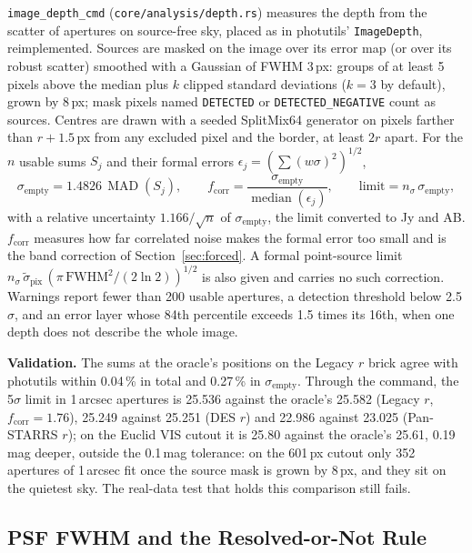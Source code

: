 \documentclass[11pt,a4paper]{article}
\newcommand{\code}[1]{\texttt{\small #1}}
\begin{document}
    \code{image\_depth\_cmd} (\code{core/analysis/depth.rs}) measures the depth from the scatter of apertures on source-free sky, placed as in photutils' \code{ImageDepth}, reimplemented. Sources are masked on the image over its error map (or over its robust scatter) smoothed with a Gaussian of FWHM 3\,px: groups of at least 5 pixels above the median plus $k$ clipped standard deviations ($k = 3$ by default), grown by 8\,px; mask pixels named \code{DETECTED} or \code{DETECTED\_NEGATIVE} count as sources. Centres are drawn with a seeded SplitMix64 generator on pixels farther than $r + 1.5$\,px from any excluded pixel and the border, at least $2r$ apart. For the $n$ usable sums $S_j$ and their formal errors $\epsilon_j = (\sum (w\sigma)^2)^{1/2}$,
    \begin{equation}
        \sigma_{\text{empty}} = 1.4826\,\operatorname{MAD}(S_j), \qquad
        f_{\text{corr}} = \frac{\sigma_{\text{empty}}}{\operatorname{median}(\epsilon_j)}, \qquad
        \text{limit} = n_\sigma\,\sigma_{\text{empty}},
    \end{equation}
    with a relative uncertainty $1.166/\sqrt{n}$ of $\sigma_{\text{empty}}$, the limit converted to Jy and AB. $f_{\text{corr}}$ measures how far correlated noise makes the formal error too small and is the band correction of Section~\ref{sec:forced}. A formal point-source limit $n_\sigma\,\tilde{\sigma}_{\text{pix}}\,(\pi\,\text{FWHM}^2/(2\ln 2))^{1/2}$ is also given and carries no such correction. Warnings report fewer than 200 usable apertures, a detection threshold below 2.5$\sigma$, and an error layer whose 84th percentile exceeds 1.5 times its 16th, when one depth does not describe the whole image.

    \textbf{Validation.} The sums at the oracle's positions on the Legacy $r$ brick agree with photutils within 0.04\,\% in total and 0.27\,\% in $\sigma_{\text{empty}}$. Through the command, the 5$\sigma$ limit in 1\,arcsec apertures is 25.536 against the oracle's 25.582 (Legacy $r$, $f_{\text{corr}} = 1.76$), 25.249 against 25.251 (DES $r$) and 22.986 against 23.025 (Pan-STARRS $r$); on the Euclid VIS cutout it is 25.80 against the oracle's 25.61, 0.19\,mag deeper, outside the 0.1\,mag tolerance: on the 601\,px cutout only 352 apertures of 1\,arcsec fit once the source mask is grown by 8\,px, and they sit on the quietest sky. The real-data test that holds this comparison still fails.

    \subsection{PSF FWHM and the Resolved-or-Not Rule}
    \label{sec:resolution}
\end{document}
